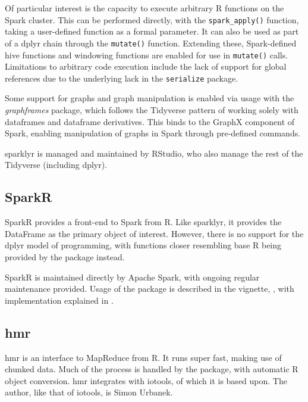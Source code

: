 Of particular interest is the capacity to execute arbitrary R functions
on the Spark cluster. This can be performed directly, with the
\texttt{spark_apply()} function, taking a
user-defined function as a formal parameter. It can also be used as part
of a dplyr chain through the \texttt{mutate()}
function. Extending these, Spark-defined hive functions and windowing
functions are enabled for use in
\texttt{mutate()} calls. Limitations to
arbitrary code execution include the lack of support for global
references due to the underlying lack in the \texttt{serialize} package.

Some support for graphs and graph manipulation is enabled via usage with
the \emph{graphframes} package, which follows the Tidyverse pattern of
working solely with dataframes and dataframe derivatives\cite{kuo18}.
This binds to the GraphX component of Spark, enabling manipulation of
graphs in Spark through pre-defined commands.

sparklyr is managed and maintained by RStudio, who also manage the rest
of the Tidyverse (including dplyr).

\hypertarget{sec:sparklyr}{%
    \subsection{SparkR}\label{sec:sparklyr}}

SparkR provides a front-end to Spark from
R\cite{venkataraman20:_spark}. Like sparklyr, it provides the DataFrame
as the primary object of interest. However, there is no support for the
dplyr model of programming, with functions closer resembling base R
being provided by the package instead.

SparkR is maintained directly by Apache Spark, with ongoing regular
maintenance provided. Usage of the package is described in the vignette,
\cite{venktaraman19:_spark_pract_guide}, with implementation
explained in \cite{venkataraman2016sparkr}.

\hypertarget{sec:hmr}{%
    \subsection{hmr}\label{sec:hmr}}

hmr is an interface to MapReduce from R\cite{urbanek20}. It runs super
fast, making use of chunked data. Much of the process is handled by the
package, with automatic R object conversion. hmr integrates with
iotools, of which it is based upon. The author, like that of iotools, is
Simon Urbanek.

